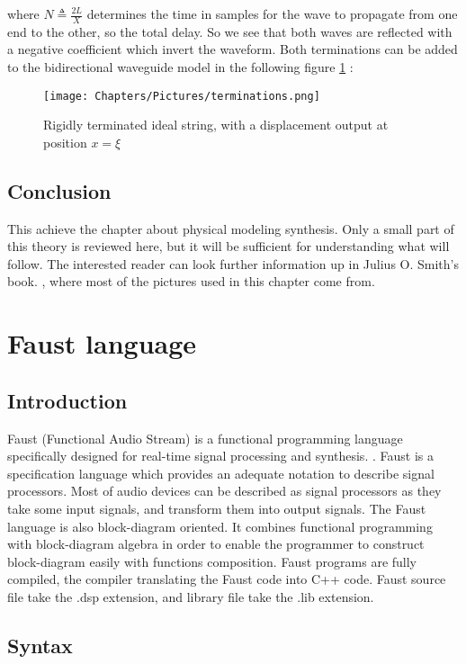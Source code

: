 where $N \triangleq \frac{2L}{X}$ determines the time in samples for the wave to propagate from one end to the other, so the total delay.
So we see that both waves are reflected with a negative coefficient which invert the waveform. Both terminations can be added to the bidirectional waveguide model in the following figure \ref{fig:terminations} :

\begin{figure}[h]
    \centering
    \texttt{[image: Chapters/Pictures/terminations.png]}
    \caption{Rigidly terminated ideal string, with a displacement output at position $x = \xi$}
    \label{fig:terminations}
\end{figure}

\subsection{Conclusion}
This achieve the chapter about physical modeling synthesis. Only a small part of this theory is reviewed here, but it will be sufficient for understanding what will follow. The interested reader can look further information up in Julius O. Smith's book. \cite{pasp}, where most of the pictures used in this chapter come from.

\section{Faust language}

\subsection{Introduction}

Faust (Functional Audio Stream) is a functional programming language specifically designed for real-time signal processing and synthesis. \cite{quickref}. Faust is a specification language which provides an adequate notation to describe signal processors. Most of audio devices can be described as signal processors as they take some input signals, and transform them into output signals. The Faust language is also block-diagram oriented. It combines functional programming with block-diagram algebra in order to enable the programmer to construct block-diagram easily with functions composition. Faust programs are fully compiled, the compiler translating the Faust code into C++ code.
Faust source file take the .dsp extension, and library file take the .lib extension.

\subsection{Syntax}

